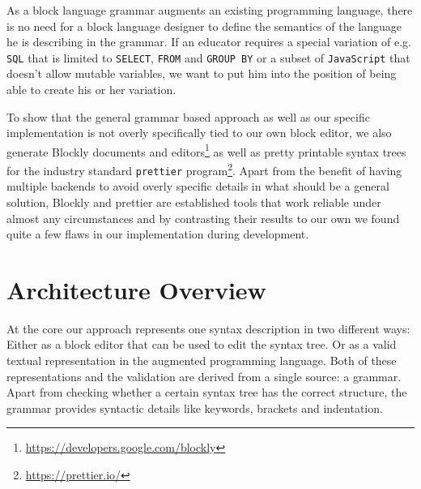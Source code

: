 \documentclass[sigconf,natbib=false]{acmart}
\newcommand\todo[1]{{\bfseries ToDo: #1}}
\begin{document}
As a block language grammar augments an existing programming language, there is no need for a block language designer to define the semantics of the language he is describing in the grammar. If an educator requires a special variation of e.g. \texttt{SQL} that is limited to \texttt{SELECT}, \texttt{FROM} and \texttt{GROUP BY} or a subset of \texttt{JavaScript} that doesn't allow mutable variables, we want to put him into the position of being able to create his or her variation.

To show that the general grammar based approach as well as our specific implementation is not overly specifically tied to our own block editor, we also generate Blockly documents and editors\footnote{\url{https://developers.google.com/blockly}} as well as pretty printable syntax trees for the industry standard \texttt{prettier} program\footnote{\url{https://prettier.io/}}. Apart from the benefit of having multiple backends to avoid overly specific details in what should be a general solution, Blockly and prettier are established tools that work reliable under almost any circumstances and by contrasting their results to our own we found quite a few flaws in our implementation during development.

\section{Architecture Overview}

At the core our approach represents one syntax description in two different ways: Either as a block editor that can be used to edit the syntax tree. Or as a valid textual representation in the augmented programming language. Both of these representations and the validation are derived from a single source: a grammar. Apart from checking whether a certain syntax tree has the correct structure, the grammar provides syntactic details like keywords, brackets and indentation.
\end{document}

